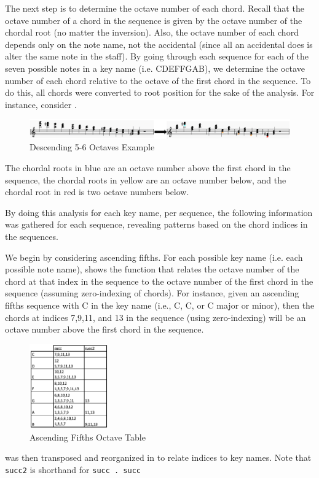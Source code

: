 \documentclass{report}
\begin{document}
The next step is to determine the octave number of each chord. Recall that the octave number of a chord in the sequence is given by the octave number of the chordal root (no matter the inversion). Also, the octave number of each chord depends only on the note name, not the accidental (since all an accidental does is alter the same note in the staff). By going through each sequence for each of the seven possible notes in a key name (i.e. CDEFFGAB), we determine the octave number of each chord relative to the octave of the first chord in the sequence. To do this, all chords were converted to root position for the sake of the analysis. For instance, consider . 

\begin{figure}[h!]
\centering
\includegraphics[width=1.1\textwidth]{images/desc56-example}
  \caption{Descending 5-6 Octaves Example}
  \label{fig:desc56-example}
\end{figure}

The chordal roots in blue are an octave number above the first chord in the sequence,  the chordal roots in yellow are an octave number below, and the chordal  root in red is two octave numbers below.

By doing this analysis for each key name, per sequence, the following information was gathered for each sequence, revealing patterns based on the chord indices in the sequences.

We begin by considering ascending fifths. For each possible key name (i.e. each possible note name),  shows the function that relates the octave number of the chord at that index in the sequence to the octave number of the first chord in the sequence (assuming zero-indexing of chords). For instance, given an ascending fifths sequence with C in the key name (i.e., C\musFlat, C\musNatural, or C\musSharp \; major or minor), then the chords at indices 7,9,11, and 13 in the sequence (using zero-indexing) will be an octave number above the first chord in the sequence.

\begin{figure}[h!]
\centering
\includegraphics[width=0.3\textwidth]{images/asc_fifths_octave_grid}
  \caption{Ascending Fifths Octave Table}
  \label{fig:asc_fifths_octave_grid}
\end{figure}
\newpage
  was then transposed and reorganized in   to relate indices to key names. Note that \verb.succ2. is shorthand for \verb!succ . succ!
\end{document}

